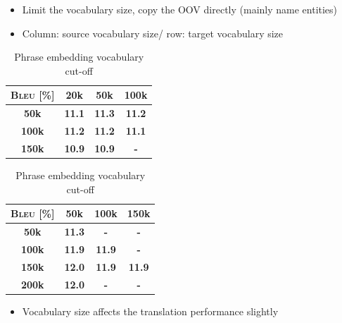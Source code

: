 \documentclass[11pt, a4paper, landscape]{article}
\begin{document}
\NewPage
{}

\begin{itemize}
	\item Limit the vocabulary size,  copy the OOV directly (mainly name entities) 
	\item Column: source vocabulary size/ row: target vocabulary size
\end{itemize}


\begin{table}
	\parbox{.5\linewidth}{
		\centering
		\caption{Word embedding vocabulary cut-off}
		\begin{tabular}{>{\bfseries}c >{\bfseries}c >{\bfseries}c >{\bfseries}c } 
			\hline
			\textsc{Bleu} [\%]	& 20k & 50k & 100k \\
			\hline
			50k &	11.1  & \leavevmode\color{blue}11.3 & 11.2  \\ 
			\hline
			100k&	11.2  & 11.2 & 11.1 \\ 			
			\hline
			150k&	10.9 & 10.9 & - \\
			\hline
		\end{tabular}
		
	}
	\hfill
	\parbox{.5\linewidth}{
		\centering
		\caption{Phrase embedding vocabulary cut-off}
		\begin{tabular}{>{\bfseries}c >{\bfseries}c >{\bfseries}c >{\bfseries}c } 
			\hline
			\textsc{Bleu} [\%]	& 50k & 100k & 150k \\
			\hline
			50k &	11.3  & - & -  \\ 
			\hline
			100k&	11.9  & 11.9 & - \\ 			
			\hline
			150k&	\leavevmode\color{blue}12.0 & 11.9 & 11.9 \\
			\hline
			200k & 12.0 & - & - \\
			\hline
		\end{tabular}
		
	}
\end{table}

\begin{itemize}
	\item Vocabulary size affects the translation performance slightly
\end{itemize}



\vfill	
\end{document}
